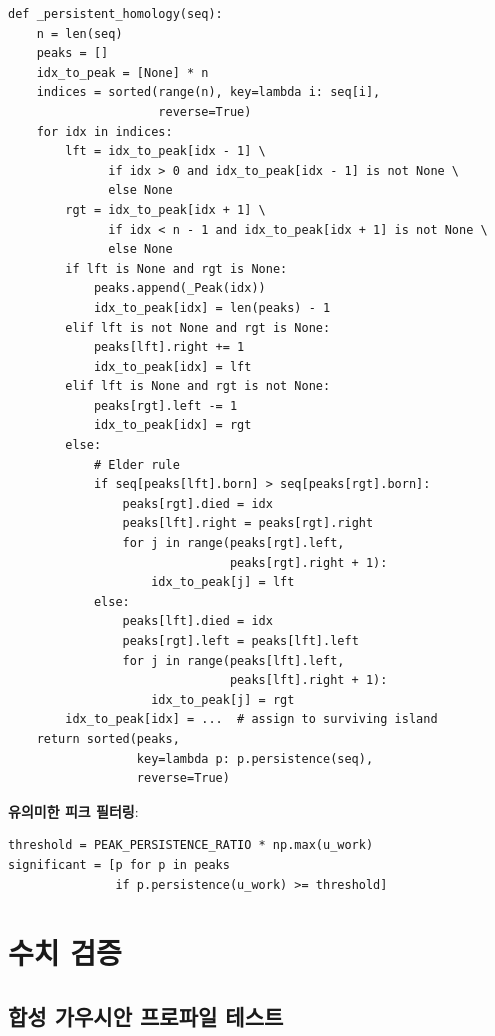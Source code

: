 \documentclass[11pt]{article}
\begin{document}
\begin{lstlisting}
def _persistent_homology(seq):
    n = len(seq)
    peaks = []
    idx_to_peak = [None] * n
    indices = sorted(range(n), key=lambda i: seq[i],
                     reverse=True)
    for idx in indices:
        lft = idx_to_peak[idx - 1] \
              if idx > 0 and idx_to_peak[idx - 1] is not None \
              else None
        rgt = idx_to_peak[idx + 1] \
              if idx < n - 1 and idx_to_peak[idx + 1] is not None \
              else None
        if lft is None and rgt is None:
            peaks.append(_Peak(idx))
            idx_to_peak[idx] = len(peaks) - 1
        elif lft is not None and rgt is None:
            peaks[lft].right += 1
            idx_to_peak[idx] = lft
        elif lft is None and rgt is not None:
            peaks[rgt].left -= 1
            idx_to_peak[idx] = rgt
        else:
            # Elder rule
            if seq[peaks[lft].born] > seq[peaks[rgt].born]:
                peaks[rgt].died = idx
                peaks[lft].right = peaks[rgt].right
                for j in range(peaks[rgt].left,
                               peaks[rgt].right + 1):
                    idx_to_peak[j] = lft
            else:
                peaks[lft].died = idx
                peaks[rgt].left = peaks[lft].left
                for j in range(peaks[lft].left,
                               peaks[lft].right + 1):
                    idx_to_peak[j] = rgt
        idx_to_peak[idx] = ...  # assign to surviving island
    return sorted(peaks,
                  key=lambda p: p.persistence(seq),
                  reverse=True)
\end{lstlisting}

\textbf{유의미한 피크 필터링}:

\begin{lstlisting}
threshold = PEAK_PERSISTENCE_RATIO * np.max(u_work)
significant = [p for p in peaks
               if p.persistence(u_work) >= threshold]
\end{lstlisting}


\section{수치 검증}

\subsection{합성 가우시안 프로파일 테스트}
\end{document}
